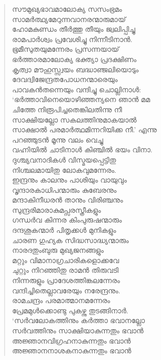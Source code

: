 \begin{verse}
സൗമുഖ്യഭാവമാലോക്യ സസംഭ്രമം\\
സാമര്‍ത്ഥ്യമേറുന്നവാനരന്മാരുമായ്\\
ഹോമകുണ്ഡം തീര്‍ത്തു തീയും ജ്വലിപ്പിച്ചു\\
രാമപാര്‍ശ്വം പ്രവേശിച്ചു നിന്നീടിനാന്‍.\\
ഭൂമീസുതയുമന്നേരം പ്രസന്നയായ്\\
ഭര്‍ത്താരമാലോക്യ ഭക്ത്യാ പ്രദക്ഷിണം\\
കൃത്വാ മൗഹുസ്സ്വയം ബദ്ധാഞ്ജലിയൊടും\\
ദേവദ്വിജേന്ദ്രതപോധനന്മാരെയും\\
പാവകന്‍തന്നെയും വന്ദിച്ചു ചൊല്ലിനാള്‍:\\
‘ഭര്‍ത്താവിനെയൊഴിഞ്ഞന്യനെ ഞാന്‍ മമ\\
ചിത്തേ നിരൂപിച്ചതെങ്കിലതിന്നു നീ\\
സാക്ഷിയല്ലോ സകലത്തിനുമാകയാല്‍\\
സാക്ഷാല്‍ പരമാര്‍ത്ഥമിന്നറിയിക്ക നീ.’ എന്നു\\
പറഞ്ഞുടന്‍ മൂന്നു വലം വെച്ചു\\
വഹ്നിയില്‍ ചാടിനാള്‍ കിഞ്ചില്‍ ഭയം വിനാ.\\
ദുശ്ച്യവനാദികള്‍ വിസ്മയപ്പെട്ടിതു\\
നിശ്ചലമായിതു ലോകവുമന്നേരം.\\
ഇന്ദ്രനും കാലനും പാശിയും വായുവും\\
വൃന്ദാരകാധിപന്മാരും കുബേരനും\\
മന്ദാകിനീധരന്‍ താനും വിരിഞ്ചനും\\
സുന്ദ്രരിമാരാകുമപ്സരസ്ത്രീകളും\\
ഗന്ധര്‍വ കിന്നര കിംപുരുഷന്മാരും\\
ദന്ദശൂകന്മാര്‍ പിതൃക്കള്‍ മുനികളും\\
ചാരണ ഗുഹ്യക സിദ്ധസാദ്ധ്യന്മാരും\\
നാരദതുംബുരു മുഖ്യജനങ്ങളും\\
മറ്റും വിമാനാഗ്രചാരികളൊക്കവേ\\
ചുറ്റും നിറഞ്ഞിതു രാമന്‍ തിരുവടി\\
നിന്നരുളും പ്രാദേശത്തിങ്കലന്നേരം\\
വന്ദിച്ചിതെല്ലാവരേയും നരേന്ദ്രനും.\\
രാമചന്ദ്രം പരമാത്മാനമന്നേരം\\
പ്രേമമുള്‍ക്കൊണ്ടു പുകഴ്ന്നു തുടങ്ങിനാര്‍.\\
‘സര്‍വലോകത്തിനും കര്‍ത്താ ഭവാനല്ലോ\\
സര്‍വത്തിനും സാക്ഷിയാകുന്നതും ഭവാന്‍\\
അജ്ഞാനവിഗ്രഹനാകുന്നതും ഭവാന്‍\\
അജ്ഞാനനാശകനാകുന്നതും ഭവാന്‍\\

\end{verse}
